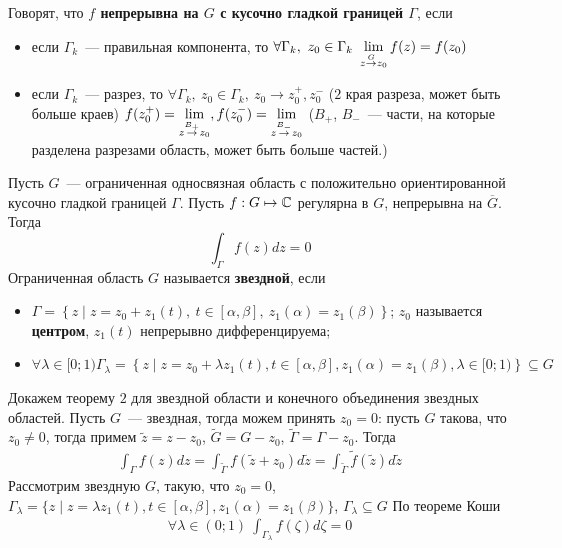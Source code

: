 Говорят, что \textbf{$f$ непрерывна на $G$ с кусочно гладкой границей $\Gamma$},
если
\begin{itemize}
    \item если $\Gamma_k$~--- правильная компонента, то $\forall \Gamma_k, \ z_0
    \in \Gamma_k \ \dst \lim_{z \overset{G}{\to} z_0}f(z) = f(z_0)$
    \item если $\Gamma_k$~--- разрез, то $\forall \Gamma_k, \ z_0 \in \Gamma_k,
    \ z_0 \to z_0^+, z_0^-$ ($2$ края разреза, может быть больше краев)
    $f(z_0^+) = \displaystyle \lim_{z \overset{B_+}{\to} z_0}, f(z_0^-) = \displaystyle \lim_{z
      \overset{B_-}{\to}z_0}$ ($B_+$, $B_-$~--- части, на которые разделена
    разрезами область, может быть больше частей.)
\end{itemize}
\theorem
Пусть $G$~--- ограниченная односвязная область с положительно ориентированной
кусочно гладкой границей $\Gamma$. Пусть $f: G \mapsto \mathbb{C}$ регулярна в $G$,
непрерывна на $\overline{G}$. Тогда
\begin{equation}\label{(7.4)}
  \int_{\Gamma}f(z)dz = 0
\end{equation}
\Def
Ограниченная область $G$ называется \textbf{звездной}, если
\begin{itemize}
    \item $\Gamma = \left\{z \mid z = z_0 + z_1(t), \ t \in [\alpha, \beta], \
        z_1(\alpha) = z_1(\beta) \right\}$; $z_0$ называется \textbf{центром},
    $z_1(t)$ непрерывно дифференцируема;
    \item $\forall \lambda \in [0;1) \Gamma_{\lambda} = \left\{ z \mid z = z_0 +
    \lambda z_1(t), t \in [\alpha, \beta], z_1(\alpha) = z_1(\beta), \lambda \in
    [0;1)\right\} \subseteq G$
\end{itemize}
Докажем теорему $2$ для звездной области и конечного объединения звездных
областей.
\pr
Пусть $G$~--- звездная, тогда можем принять $z_0=0$: пусть $G$ такова, что $z_0
\neq 0$, тогда примем $\tilde{z} = z-z_0$, $\tilde{G} = G-z_0$, $\tilde{\Gamma}
= \Gamma - z_0$. Тогда
\begin{align*}
  \int_{\Gamma}f(z)dz = \int_{\tilde{\Gamma}}f(\tilde{z}+z_0)d\tilde{z} = \int_{\tilde{\Gamma}}\tilde{f}(\tilde{z})d\tilde{z}
\end{align*}
Рассмотрим звездную $G$, такую, что $z_0 = 0$, $\Gamma_{\lambda} = \{z \mid z =
\lambda z_1(t), t\in[\alpha, \beta], z_1(\alpha) = z_1(\beta)\}$,
$\Gamma_{\lambda}\subseteq G$
По теореме Коши 
\begin{align*}
  \forall \lambda \in (0;1) \ \int_{\Gamma_\lambda}f(\zeta)d\zeta = 0
\end{align*}
